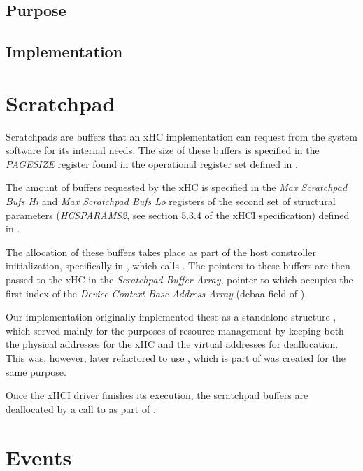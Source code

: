\subsection{Purpose}
\subsection{Implementation}

\section{Scratchpad}

Scratchpads are buffers that an xHC implementation can request from the system software
for its internal needs. The size of these buffers is specified in the \textit{PAGESIZE} register
found in the operational register set defined in .

The amount of buffers requested by the xHC is specified in the \textit{Max Scratchpad Bufs Hi} and
\textit{Max Scratchpad Bufs Lo} registers of the second set of structural parameters (\textit{HCSPARAMS2},
see section 5.3.4 of the xHCI specification) defined in .

The allocation of these buffers takes place as part of the host constroller initialization,
specifically in , which calls . The pointers
to these buffers are then passed to the xHC in the \textit{Scratchpad Buffer Array}, pointer to which
occupies the first index of the \textit{Device Context Base Address Array} (dcbaa field of
).

Our implementation originally implemented these as a standalone structure ,
which served mainly for the purposes of resource management by keeping both the physical addresses
for the xHC and the virtual addresses for deallocation. This was, however, later refactored to use
, which is part of  was created for the same purpose.

Once the xHCI driver finishes its execution, the scratchpad buffers are deallocated by a call to
 as part of .


\section{Events}

